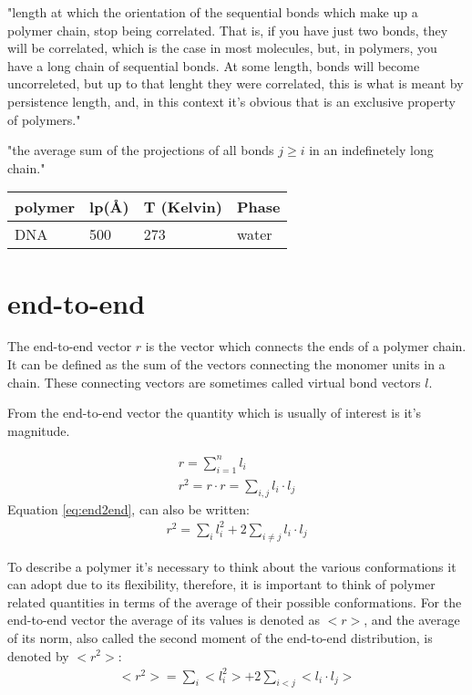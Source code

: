 "length at which the orientation of the sequential bonds which make
up a polymer chain, stop being correlated. That is, if you have just
two bonds, they will be correlated, which is the case in most
molecules, but, in polymers, you have a long chain of sequential
bonds. At some length, bonds will become uncorreleted, but up to that
lenght they were correlated, this is what is meant by persistence
length, and, in this context it's obvious that is an exclusive
property of polymers."

"the average sum of the projections of all bonds $ j \geq i$  in an 
indefinetely long chain."


\begin{table}[htbp]
\begin{center}
\begin{tabular}{|l|l|l|l|}
\hline 
polymer & lp(\AA) & T (Kelvin) & Phase \\ \hline
DNA     & 500     &  273       & water \\ \hline
\end{tabular}
\end{center}
\end{table}



\section{end-to-end}
The end-to-end vector  $r$ is the vector which connects  the ends of a 
polymer chain.  It  can be defined  as the sum  of the vectors connecting the
monomer units in a chain. These connecting vectors are sometimes called
virtual  bond vectors $l$.  

From  the end-to-end  vector  the quantity
which is usually of interest is it's magnitude.

\begin{gather}
\label{eq:end2end}
r = \sum_{i=1}^{n} l_{i}\\
r^2 = r \cdot r = \sum_{i,j}l_{i} \cdot l_{j}
\end{gather}
Equation \ref{eq:end2end}, can also be written:
\begin{gather}
r^2 = \sum_{i}l_{i}^{2} + 2 \sum_{i\neq j} l_{i} \cdot l_{j}
\end{gather}  

To  describe a  polymer  it's  necessary to  think  about the  various
conformations it can adopt  due to its flexibility, therefore, it
is important  to think of polymer  related quantities in  terms of the
average of their possible conformations. For the end-to-end vector the
average of  its values  is denoted  as $<r>$, and  the average  of its
norm, also called the second moment of the end-to-end distribution, is
denoted by $<r^2>$:
\begin{gather}
\label{eq:secmom}  
<r^2>=\sum_{i}<l_{i}^2> + 2\sum_{i<j}<l_{i} \cdot l_{j}>
\end{gather}  

